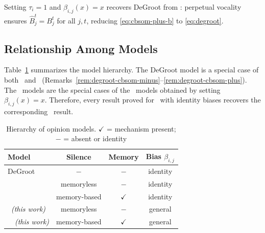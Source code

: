 \begin{remark}\label{rem:degroot-cbsom-plus}
  Setting $\tau_i=1$ and $\beta_{i,j}(x)=x$ recovers DeGroot from
  \CBSOMplus: perpetual vocality ensures $\hat{B}_j^t=B_j^t$ for
  all $j,t$, reducing \eqref{eq:cbsom-plus-b} to \eqref{eq:degroot}.
\end{remark}

\subsection{Relationship Among Models}
\label{sec:model-relations}

Table~\ref{tab:models} summarizes the model hierarchy.
The DeGroot model is a special case of both \CBSOMminus\ and \CBSOMplus\
(Remarks~\ref{rem:degroot-cbsom-minus}--\ref{rem:degroot-cbsom-plus}).
The \SOM\ models are the special cases of the \CBSOM\ models obtained
by setting $\beta_{i,j}(x)=x$. Therefore, every result proved for \CBSOM\
with identity biases recovers the corresponding \SOM\ result.

\begin{table}[!htbp]
\centering
\caption{Hierarchy of opinion models.
  $\checkmark$ = mechanism present; $-$ = absent or identity}
\label{tab:models}
\begin{tabular}{lccc}
  \hline
  \textbf{Model} & \textbf{Silence} & \textbf{Memory} & \textbf{Bias $\beta_{i,j}$}\\
  \hline
  DeGroot~\cite{DeGroot1974}               & $-$          & $-$  & identity\\
  \SOMminus~\cite{aranda2024sound}         & memoryless   & $-$  & identity\\
  \SOMplus~\cite{aranda2024sound}         & memory-based & $\checkmark$ & identity\\
  \CBSOMminus\ \emph{(this work)}          & memoryless   & $-$  & general\\
  \CBSOMplus\ \ \emph{(this work)}         & memory-based & $\checkmark$ & general\\
  \hline
\end{tabular}
\end{table}
